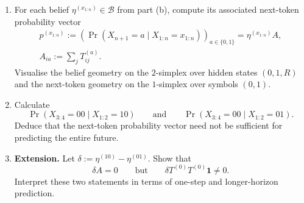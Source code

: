 \begin{exercise}
\begin{enumerate}
    \item For each belief $\eta^{(x_{1:n})}\in\mathcal B$ from part (b),
      compute its associated next-token probability vector
      \[
        \begin{gathered}
        p^{(x_{1:n})}
        :=\left(
          \Pr(X_{n+1}=a\mid X_{1:n}=x_{1:n})
        \right)_{a\in\{0,1\}}
        =\eta^{(x_{1:n})}A,\\[1mm]
        A_{ia}:=\sum_jT^{(a)}_{ij}.
        \end{gathered}
      \]
      Visualise the belief geometry on the $2$-simplex over hidden states
      $(0,1,R)$ and the next-token geometry on the $1$-simplex over symbols
      $(0,1)$.

    \item Calculate
      \[
        \Pr(X_{3:4}=00\mid X_{1:2}=10)
        \qquad\text{and}\qquad
        \Pr(X_{3:4}=00\mid X_{1:2}=01).
      \]
      Deduce that the next-token probability vector need not be sufficient for
      predicting the entire future.

    \item \textbf{Extension.} Let
      $\delta:=\eta^{(10)}-\eta^{(01)}$. Show that
      \[
        \delta A=0
        \qquad\text{but}\qquad
        \delta T^{(0)}T^{(0)}\mathbf 1\neq0.
      \]
      Interpret these two statements in terms of one-step and longer-horizon
      prediction.
  \end{enumerate}
\end{exercise}
